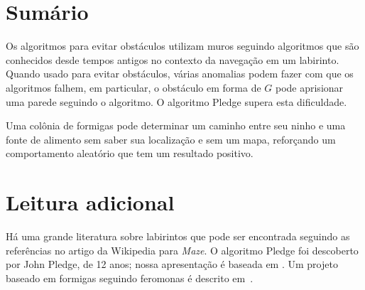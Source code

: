 \section{Sumário}

Os algoritmos para evitar obstáculos utilizam muros seguindo algoritmos que são conhecidos desde tempos antigos no contexto da navegação em um labirinto. Quando usado para evitar obstáculos, várias anomalias podem fazer com que os algoritmos falhem, em particular, o obstáculo em forma de $G$ pode aprisionar uma parede seguindo o algoritmo. O algoritmo Pledge supera esta dificuldade.

Uma colônia de formigas pode determinar um caminho entre seu ninho e uma fonte de alimento sem saber sua localização e sem um mapa, reforçando um comportamento aleatório que tem um resultado positivo.

\section{Leitura adicional}

Há uma grande literatura sobre labirintos que pode ser encontrada seguindo as referências no artigo da Wikipedia para \emph{Maze}. O algoritmo Pledge foi descoberto por John Pledge, de 12 anos; nossa apresentação é baseada em \cite[Cap.~4]{turtle}. Um projeto baseado em formigas seguindo feromonas é descrito em~\cite{Mayet2010}.
